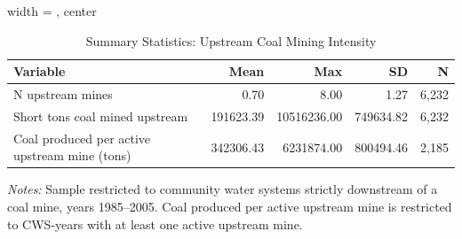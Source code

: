\begin{table}[htbp]
\centering
\caption{\label{tab:upstream_coal_summary} Summary Statistics: Upstream Coal Mining Intensity}
\begin{adjustbox}{width = \textwidth, center}
\begin{tabular}{lrrrr}
\toprule
Variable & Mean & Max & SD & N \\
\midrule
N upstream mines & 0.70 & 8.00 & 1.27 & 6,232 \\
Short tons coal mined upstream & 191623.39 & 10516236.00 & 749634.82 & 6,232 \\
Coal produced per active upstream mine (tons) & 342306.43 & 6231874.00 & 800494.46 & 2,185 \\
\bottomrule
\end{tabular}
\end{adjustbox}
\begin{minipage}{\linewidth}
\vspace{4pt}
\footnotesize
\raggedright
\textit{Notes:} Sample restricted to community water systems strictly downstream of a coal mine, years 1985--2005. Coal produced per active upstream mine is restricted to CWS-years with at least one active upstream mine.
\end{minipage}
\end{table}
